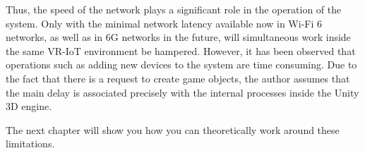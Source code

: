 Thus, the speed of the network plays a significant role in the operation of the system. Only with the minimal network latency available now in Wi-Fi 6 networks, as well as in 6G networks in the future, will simultaneous work inside the same VR-IoT environment be hampered. However, it has been observed that operations such as adding new devices to the system are time consuming. Due to the fact that there is a request to create game objects, the author assumes that the main delay is associated precisely with the internal processes inside the Unity 3D engine.

The next chapter will show you how you can theoretically work around these limitations.